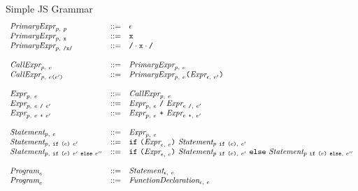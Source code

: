 \documentclass[preprint,10pt]{sigplanconf}
\begin{document}
\begin{displayfigure*}{\label{fig:grammar}Simple JS Grammar}
\[
\begin{array}{lcl}
  \textit{PrimaryExpr}_{p,~p} &::=& \epsilon \\
  \textit{PrimaryExpr}_{p,~\texttt{x}} &::=& \texttt{x} \\
  \textit{PrimaryExpr}_{p,~\texttt{/x/}} &::=& \texttt{/} \cdot \texttt{x} \cdot \texttt{/} \\
  \\
  \textit{CallExpr}_{p,~e} &::=& \textit{PrimaryExpr}_{p,~e} \\
  \textit{CallExpr}_{p,~e \texttt{(}e'\texttt{)}} 
  &::=& 
  \textit{PrimaryExpr}_{p,~e} \texttt{(}
    \textit{Expr}_{\epsilon,~e'}
  \texttt{)} \\
  \\
  \textit{Expr}_{p,~e} &::=& \textit{CallExpr}_{p,~e} \\
  \textit{Expr}_{p,~e ~\texttt{/}~ e'}
  &::=&
  \textit{Expr}_{p,~e} ~\texttt{/}~ \textit{Expr}_{e~\texttt{/},~e'} \\
  \textit{Expr}_{p,~e ~\texttt{+}~ e'}
  &::=&
  \textit{Expr}_{p,~e} ~\texttt{+}~ \textit{Expr}_{e~\texttt{+},~e'} \\
  \\
  \textit{Statement}_{p,~e} &::=& \textit{Expr}_{p,~e} \\
  \textit{Statement}_{p,~\texttt{if}~\texttt{(}e\texttt{)}~e'} 
  &::=& 
  \texttt{if}~\texttt{(}
    \textit{Expr}_{\epsilon,~e}  
  \texttt{)}
    ~\textit{Statement}_{p~\texttt{if}~\texttt{(}e\texttt{)},~e'} 
  \\
  \textit{Statement}_{p,~\texttt{if}~\texttt{(}e\texttt{)}~e'~\texttt{else}~e''} 
  &::=& 
  \texttt{if}~\texttt{(}
    \textit{Expr}_{\epsilon,~e}
  \texttt{)}
    ~\textit{Statement}_{p~\texttt{if}~\texttt{(}e\texttt{)},~e'}
  ~\texttt{else}
    ~\textit{Statement}_{p~\texttt{if}~\texttt{(}e\texttt{)}~\texttt{else},~e''}  
  \\
  \\
  \textit{Program}_{e} &::=& \textit{Statement}_{\epsilon,~e} \\
  \textit{Program}_{e} &::=& \textit{FunctionDeclaration}_{\epsilon,~e}

\end{array}
\]  
\end{displayfigure*}
\end{document}
